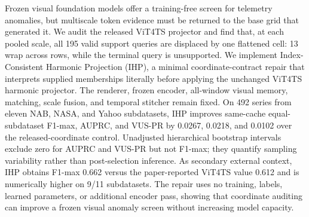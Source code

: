 Frozen visual foundation models offer a training-free screen for telemetry
anomalies, but multiscale token evidence must be returned to the base grid
that generated it. We audit the released ViT4TS projector and find that, at
each pooled scale, all 195 valid support queries are displaced by one
flattened cell: 13 wrap across rows, while the terminal query is unsupported.
We implement Index-Consistent Harmonic Projection (IHP), a minimal
coordinate-contract repair that interprets supplied memberships literally
before applying the unchanged ViT4TS harmonic projector. The renderer,
frozen encoder, all-window visual memory, matching, scale fusion, and temporal
stitcher remain fixed. On 492 series from eleven NAB, NASA, and Yahoo
subdatasets, IHP improves same-cache equal-subdataset F1-max, AUPRC, and
VUS-PR by 0.0267, 0.0218, and 0.0102 over the released-coordinate control.
Unadjusted hierarchical bootstrap intervals exclude zero for AUPRC and
VUS-PR but not F1-max; they quantify sampling variability rather than
post-selection inference. As secondary external context, IHP obtains F1-max
0.662 versus the paper-reported ViT4TS value 0.612 and is numerically higher
on 9/11 subdatasets. The repair uses no training, labels, learned parameters,
or additional encoder pass, showing that coordinate auditing can improve a
frozen visual anomaly screen without increasing model capacity.
